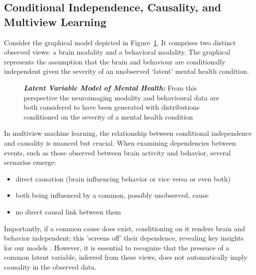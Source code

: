 \subsection{Conditional Independence, Causality, and Multiview Learning}

Consider the graphical model depicted in Figure~\ref{fig:mentalhealthselfsupervised}.
It comprises two distinct observed \gls{views}: a brain modality and a behavioral modality.
The graphical represents the assumption that the brain and behaviour are conditionally independent given the severity of an unobserved `latent' mental health condition.

\begin{figure}
    \centering
    \caption[Latent Variable Model of Mental Health]{\textit{\textbf{Latent Variable Model of Mental Health:}} From this perspective the neuroimaging modality and behavioural data are both considered to have been generated with distributions conditioned on the severity of a mental health condition}\label{fig:mentalhealthselfsupervised}
\end{figure}

In multiview machine learning, the relationship between conditional independence and causality is nuanced but crucial.
When examining dependencies between events, such as those observed between brain activity and behavior, several scenarios emerge:

\begin{itemize}
    \item direct causation (brain influencing behavior or vice versa or even both)
    \item both being influenced by a common, possibly unobserved, cause
    \item no direct causal link between them
\end{itemize}

Importantly, if a common cause does exist, conditioning on it renders brain and behavior independent; this 'screens off' their dependence, revealing key insights for our models \citep{reichenbach1956direction}.
However, it is essential to recognize that the presence of a common latent variable, inferred from these \gls{views}, does not automatically imply causality in the observed data.


